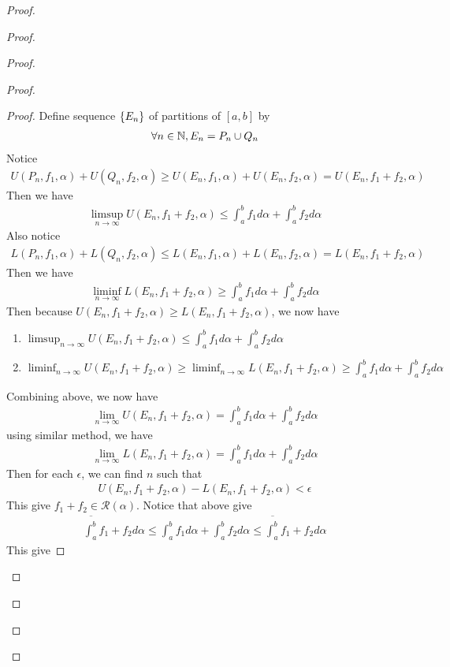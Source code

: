 \documentclass{report}
\begin{document}
\begin{proof}
\begin{proof}
\begin{proof}
\begin{proof}
\begin{proof}
Define sequence $\{ E_n \}$ of partitions of $[a,b]$ by 
\begin{align*}
\forall n\in\mathbb{N},E_n=P_n \cup Q_n
\end{align*}
Notice 
\begin{align*}
U(P_n,f_1,\alpha )+U(Q_n,f_2,\alpha )\geq U(E_n,f_1,\alpha )+U(E_n,f_2,\alpha )=U(E_n,f_1+f_2,\alpha )
\end{align*}
Then we have 
\begin{align*}
\limsup_{n\to\infty}  U(E_n,f_1+f_2,\alpha )  \leq  \int_a^b f_1 d\alpha +\int_a^b f_2 d\alpha 
\end{align*}
Also notice 
\begin{align*}
 L(P_n,f_1,\alpha )+L (Q_n,f_2,\alpha ) \leq  L(E_n,f_1,\alpha )+L(E_n,f_2,\alpha )= L(E_n,f_1+f_2,\alpha )
\end{align*}
Then we have 
\begin{align*}
\liminf_{n\to\infty} L(E_n,f_1+f_2,\alpha )\geq \int_a^b f_1 d\alpha  +\int_a^b f_2 d\alpha 
\end{align*}
Then because $U(E_n,f_1+f_2,\alpha )\geq L(E_n,f_1+f_2,\alpha )$, we now have 
\begin{enumerate}[label=(\alph*)]
  \item $\limsup_{n\to\infty} U(E_n,f_1+f_2,\alpha )\leq \int_a^b f_1 d\alpha + \int_a^b f_2 d\alpha $ 
  \item  $\liminf_{n\to\infty} U(E_n,f_1+f_2,\alpha )\geq \liminf_{n\to\infty} L(E_n,f_1+f_2,\alpha )\geq \int_a^b f_1d\alpha +\int_a^b f_2 d\alpha $
\end{enumerate}
Combining above, we now have 
\begin{align*}
\lim_{n \to \infty} U(E_n,f_1+f_2,\alpha )=\int_a^b f_1d\alpha +\int_a^b f_2 d\alpha 
\end{align*}
using similar method, we have 
\begin{align*}
\lim_{n \to \infty}L(E_n,f_1+f_2,\alpha )=\int_a^b f_1d\alpha + \int_a^b f_2 d\alpha 
\end{align*}
Then for each $\epsilon $, we can find $n$ such that 
 \begin{align*}
U(E_n,f_1+f_2,\alpha )-L(E_n,f_1+f_2,\alpha )<\epsilon 
\end{align*}
This give $f_1+f_2 \in \mathscr{R}(\alpha )$. Notice that above give 
\begin{align*}
\overline{\int_a^b} f_1+f_2 d\alpha  \leq \int_a^b f_1 d\alpha +\int_a^b f_2 d\alpha \leq \overline{\int_a^b}f_1+f_2 d\alpha 
\end{align*}
This give 

\end{proof}
\end{proof}
\end{proof}
\end{proof}
\end{proof}
\end{document}
